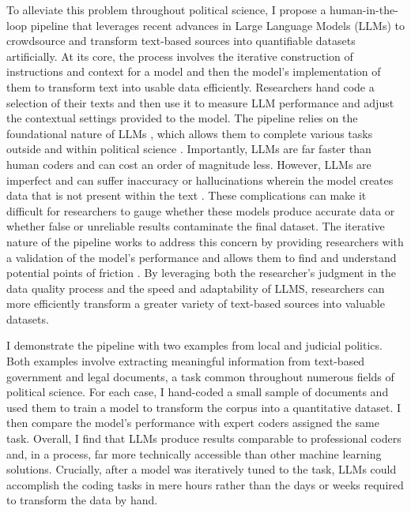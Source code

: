     To alleviate this problem throughout political science, I propose a human-in-the-loop pipeline that leverages recent advances in Large Language Models (LLMs) to crowdsource and transform text-based sources into quantifiable datasets artificially. At its core, the process involves the iterative construction of instructions and context for a model and then the model's implementation of them to transform text into usable data efficiently. Researchers hand code a selection of their texts and then use it to measure LLM performance and adjust the contextual settings provided to the model. The pipeline relies on the foundational nature of LLMs \citep{bommasaniOpportunitiesRisksFoundation2022}, which allows them to complete various tasks outside \citep{brownLanguageModelsAre2020,radfordLanguageModelsAre2019} and within political science \citep{argyleOutOneMany2023,haffnerIntroducingInterpretableDeep2023,laurerLessAnnotatingMore2023,wangFinetuningLargeLanguage2023,ornsteinHowTrainYour}. Importantly, LLMs are far faster than human coders and can cost an order of magnitude less. However, LLMs are imperfect and can suffer inaccuracy or hallucinations wherein the model creates data that is not present within the text \citep{bommasaniOpportunitiesRisksFoundation2022,benderDangersStochasticParrots2021,karpinskaLargeLanguageModels2023}. These complications can make it difficult for researchers to gauge whether these models produce accurate data or whether false or unreliable results contaminate the final dataset. The iterative nature of the pipeline works to address this concern by providing researchers with a validation of the model's performance and allows them to find and understand potential points of friction \citep{grimmerTextDataPromise2013}. By leveraging both the researcher's judgment in the data quality process and the speed and adaptability of LLMS, researchers can more efficiently transform a greater variety of text-based sources into valuable datasets.

    I demonstrate the pipeline with two examples from local and judicial politics. Both examples involve extracting meaningful information from text-based government and legal documents, a task common throughout numerous fields of political science. For each case, I hand-coded a small sample of documents and used them to train a model to transform the corpus into a quantitative dataset. I then compare the model's performance with expert coders assigned the same task. Overall, I find that LLMs produce results comparable to professional coders and, in a process, far more technically accessible than other machine learning solutions. Crucially, after a model was iteratively tuned to the task, LLMs could accomplish the coding tasks in mere hours rather than the days or weeks required to transform the data by hand.

